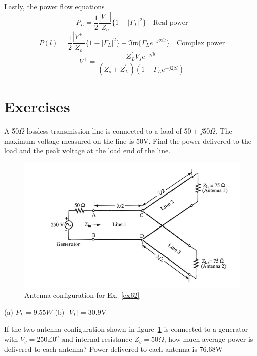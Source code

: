 Lastly, the power flow equations
\begin{dmath*}
P_L = \frac{1}{2}\frac{|V^+|}{Z_o}\lbrace 1 - |\Gamma_L|^2\rbrace\quad\text{Real power}
\end{dmath*}
\begin{dmath*}
P(l) = \frac{1}{2}\frac{|V^+|}{Z_o}\lbrace 1 - |\Gamma_L|^2\rbrace - \mathfrak{Im}\lbrace \Gamma_L e^{- j2\beta l}\rbrace\quad\text{Complex power}
\end{dmath*}
\[
V^+ = \frac{Z_L^{'}V_s e^{-j\beta l}}{(Z_s + Z_L^{'})(1 + \Gamma_L e^{-j2\beta l})}
\]

\section*{Exercises}
\begin{ExerciseList}
\Exercise[label={ex61}]
A 50$\Omega$ lossless transmission line is connected to a load of $50 + j50\Omega$. The maximum voltage measured on the line is 50V. Find the power delivered to the load and the peak voltage at the load end of the line.
\begin{figure}[h]
\centering
\includegraphics[width=1\linewidth]{./graphics/antenna_power_problem}
\caption{Antenna configuration for Ex.~\autoref{ex62}}
\label{fig:antennapowerproblem}
\end{figure}
\Answer[ref={ex61}]
(a) $P_L = 9.55W$ (b) $|V_L| = 30.9$V

\Exercise[label={ex62}]
If the two-antenna configuration shown in figure~\ref{fig:antennapowerproblem} is connected to a generator with $V_g = 250\angle0^o$ and internal resistance $Z_g = 50\varOmega$, how much average power is delivered to each antenna?
\Answer[ref={ex62}]
Power delivered to each antenna is 76.68W
\end{ExerciseList}